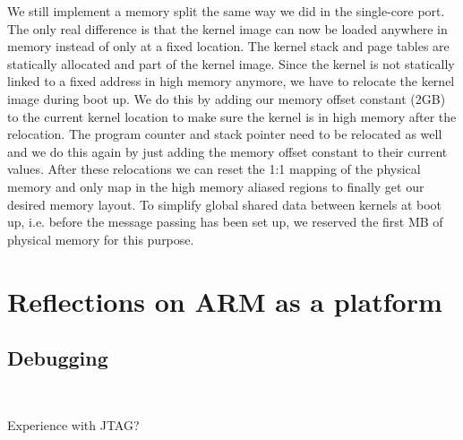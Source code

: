 \documentclass[a4paper,twoside]{report} %
\begin{document}
We still implement a memory split the same way we did in the
single-core port. The only real difference is that the kernel image
can now be loaded anywhere in memory instead of only at a fixed
location. The kernel stack and page tables are statically allocated
and part of the kernel image. Since the kernel is not statically
linked to a fixed address in high memory anymore, we have to relocate
the kernel image during boot up. We do this by adding our memory
offset constant (2GB) to the current kernel location to make sure the
kernel is in high memory after the relocation. The program counter and
stack pointer need to be relocated as well and we do this again by
just adding the memory offset constant to their current values. After
these relocations we can reset the 1:1 mapping of the physical memory
and only map in the high memory aliased regions to finally get our
desired memory layout. To simplify global shared data between kernels
at boot up, i.e. before the message passing has been set up, we
reserved the first MB of physical memory for this purpose.


\chapter{Reflections on ARM as a platform}\label{chap:refl}

\section{Debugging}~\label{debugging}

Experience with JTAG?

 

\end{document}

